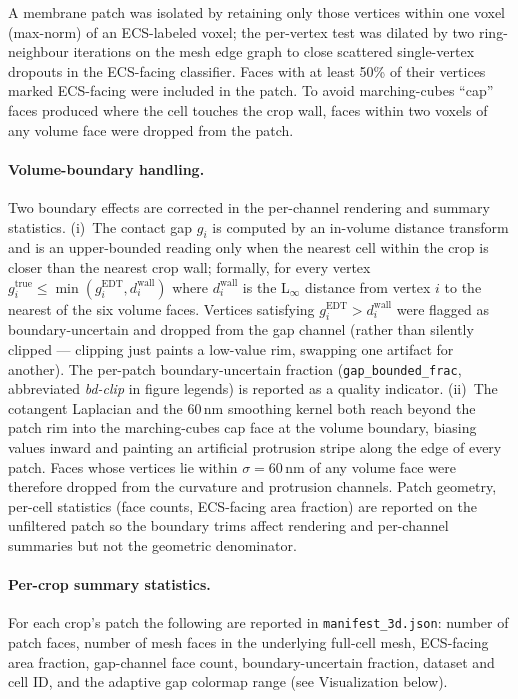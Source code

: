 A membrane patch was isolated by retaining only those vertices within
one voxel (max-norm) of an ECS-labeled voxel; the per-vertex test was
dilated by two ring-neighbour iterations on the mesh edge graph to
close scattered single-vertex dropouts in the ECS-facing classifier.
Faces with at least 50\% of their vertices marked ECS-facing were
included in the patch. To avoid marching-cubes ``cap'' faces produced
where the cell touches the crop wall, faces within two voxels of any
volume face were dropped from the patch.

\paragraph{Volume-boundary handling.}
Two boundary effects are corrected in the per-channel rendering and
summary statistics. (i)~The contact gap $g_i$ is computed by an in-volume
distance transform and is an upper-bounded reading only when the
nearest cell within the crop is closer than the nearest crop wall;
formally, for every vertex $g_i^{\text{true}} \le \min(g_i^{\text{EDT}},
d_i^{\text{wall}})$ where $d_i^{\text{wall}}$ is the L$_\infty$ distance from
vertex $i$ to the nearest of the six volume faces. Vertices satisfying
$g_i^{\text{EDT}} > d_i^{\text{wall}}$ were flagged as
boundary-uncertain and dropped from the gap channel (rather than
silently clipped --- clipping just paints a low-value rim, swapping one
artifact for another). The per-patch boundary-uncertain fraction
(\texttt{gap\_bounded\_frac}, abbreviated \emph{bd-clip} in figure legends)
is reported as a quality indicator. (ii)~The cotangent Laplacian and the
60\,nm smoothing kernel both reach beyond the patch rim into the
marching-cubes cap face at the volume boundary, biasing values inward
and painting an artificial protrusion stripe along the edge of every
patch. Faces whose vertices lie within $\sigma = 60$\,nm of any volume
face were therefore dropped from the curvature and protrusion channels.
Patch geometry, per-cell statistics (face counts, ECS-facing area
fraction) are reported on the unfiltered patch so the boundary trims
affect rendering and per-channel summaries but not the geometric
denominator.

\paragraph{Per-crop summary statistics.}
For each crop's patch the following are reported in
\texttt{manifest\_3d.json}: number of patch faces, number of mesh faces
in the underlying full-cell mesh, ECS-facing area fraction, gap-channel
face count, boundary-uncertain fraction, dataset and cell ID, and the
adaptive gap colormap range (see Visualization below).


